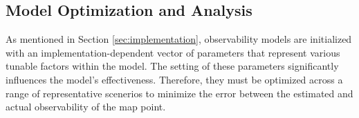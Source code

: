 \subsection{Model Optimization and Analysis}

As mentioned in Section \ref{sec:implementation}, observability models are initialized with an implementation-dependent vector of parameters that represent various tunable factors within the model. The setting of these parameters significantly influences the model's effectiveness. Therefore, they must be optimized across a range of representative scenerios to minimize the error between the estimated and actual observability of the map point. 

\subsubsection{}